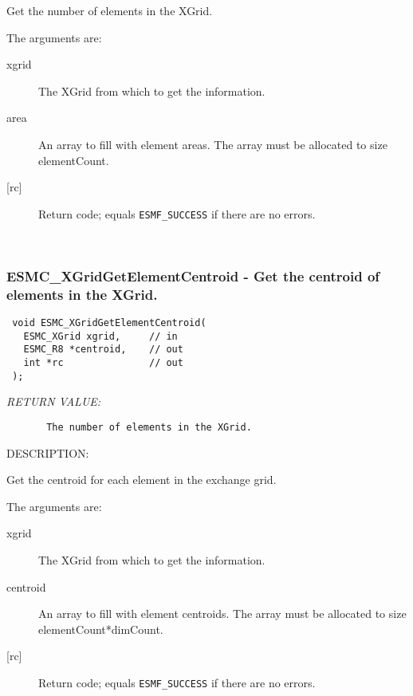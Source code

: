   
      Get the number of elements in the XGrid.
  
    The arguments are:
    \begin{description}
    \item[xgrid]
      The XGrid from which to get the information.
    \item[area]
      An array to fill with element areas. The array must be allocated
      to size elementCount.
    \item[{[rc]}]
      Return code; equals {\tt ESMF\_SUCCESS} if there are no errors.
    \end{description}
   
 
\mbox{}\hrulefill\ 
 
\subsubsection [ESMC\_XGridGetElementCentroid] {ESMC\_XGridGetElementCentroid - Get the centroid of elements in the XGrid.}


  
\begin{verbatim} void ESMC_XGridGetElementCentroid(
   ESMC_XGrid xgrid,     // in
   ESMC_R8 *centroid,    // out
   int *rc               // out
 );
 \end{verbatim}{\em RETURN VALUE:}
\begin{verbatim}       The number of elements in the XGrid.\end{verbatim}
{\sf DESCRIPTION:\\ }


  
      Get the centroid for each element in the exchange grid. 
  
    The arguments are:
    \begin{description}
    \item[xgrid]
      The XGrid from which to get the information.
    \item[centroid]
      An array to fill with element centroids. The array must be allocated
      to size elementCount*dimCount.
    \item[{[rc]}]
      Return code; equals {\tt ESMF\_SUCCESS} if there are no errors.
    \end{description}
   
 
